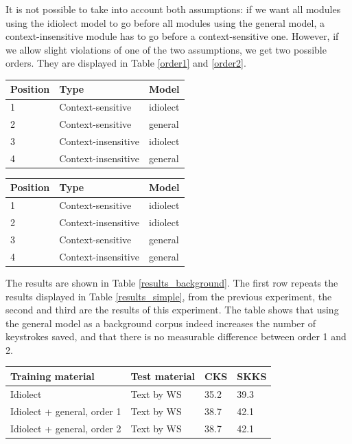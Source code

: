 \documentclass[11pt]{article}
\let\originaltable\table
\let\endoriginaltable\endtable
\renewenvironment{table}[1][ht]{%
  \originaltable[#1]
  \centering}%
  {\endoriginaltable}
\begin{document}
It is not possible to take into account both assumptions: if we want all modules using the idiolect model to go before all modules using the general model, a context-insensitive module has to go before a context-sensitive one. However, if we allow slight violations of one of the two assumptions, we get two possible orders. They are displayed in Table \ref{order1} and \ref{order2}. 

\begin{table}[H]
\begin{tabular}{lll} 
Position&Type&Model\\
\hline
1&Context-sensitive&idiolect\\
2&Context-sensitive&general\\
3&Context-insensitive&idiolect\\
4&Context-insensitive&general\\
\end{tabular} 
\caption{Module order with the general model as background model, version 1} \label{order1}
\end{table}

\begin{table}[H]
\begin{tabular}{lll} 
Position&Type&Model\\
\hline
1&Context-sensitive&idiolect\\
2&Context-insensitive&idiolect\\
3&Context-sensitive&general\\
4&Context-insensitive&general\\
\end{tabular} 
\caption{Module order with the general model as background model, version 2} \label{order2}
\end{table}

The results are shown in Table \ref{results_background}. The first row repeats the results displayed in Table \ref{results_simple}, from the previous experiment, the second and third are the results of this experiment. The table shows that using the general model as a background corpus indeed increases the number of keystrokes saved, and that there is no measurable difference between order 1 and 2.

\begin{table}[H]
\begin{tabular}{ll|ll} 
Training material&Test material&CKS&SKKS\\
\hline
Idiolect&Text by WS&35.2&39.3\\
Idiolect + general, order 1&Text by WS&38.7&42.1\\
Idiolect + general, order 2&Text by WS&38.7&42.1\\
\end{tabular} 
\caption{Percentage of keystrokes that can be saved when using the general model as background model} \label{results_background}
\end{table}
\end{document}
